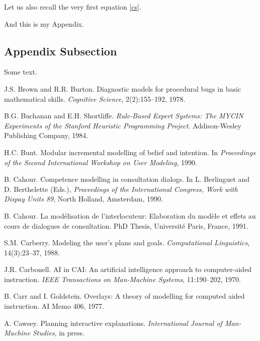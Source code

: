 \documentclass{river-journal}
\begin{document}
Let us also recall the very first equation \ref{cs}.

\appendix

And this is my Appendix.

\subsection*{Appendix Subsection}

Some text.

\nocite{*} %

%
\begin{thebibliography}{10}

J.S. Brown and R.R. Burton.
Diagnostic models for procedural bugs in basic mathematical skills.
{\em Cognitive Science}, 2(2):155--192, 1978.

B.G. Buchanan and E.H. Shortliffe.
{\em Rule-Based Expert Systems: The MYCIN Experiments of the Stanford
  Heuristic Programming Project}.
Addison-Wesley Publishing Company, 1984.

H.C. Bunt.
 Modular incremental modelling of belief and intention.
 In {\em Proceedings of the Second International Workshop on User
  Modeling}, 1990.

B. Cahour.
 Competence modelling in consultation dialogs.
 In L. Berlinguet and D. Berthelette (Eds.), {\em Proceedings
  of the International Congress, Work with Dispay Units 89}, North Holland, Amsterdam, 1990. 

B. Cahour.
 {La mod{\'e}lisation de l'interlocuteur: Elaboration du
  mod{\`e}le et effets au cours de dialogues de consultation}.
 PhD Thesis, Universit{\'e} Paris, France, 1991.

S.M. Carberry.
 Modeling the user's plans and goals.
 {\em Computational Linguistics}, 14(3):23--37, 1988.

J.R. Carbonell.
 AI in CAI: An artificial intelligence approach to computer-aided
  instruction.
 {\em IEEE Transactions on Man-Machine Systems}, 11:190--202, 1970.

B. Carr and I. Goldstein.
 Overlays: A theory of modelling for computed aided instruction.
 AI Memo 406, 1977.

A. Cawsey.
 Planning interactive explanations.
 {\em International Journal of Man-Machine Studies}, in press.


\end{thebibliography}
\end{document}
